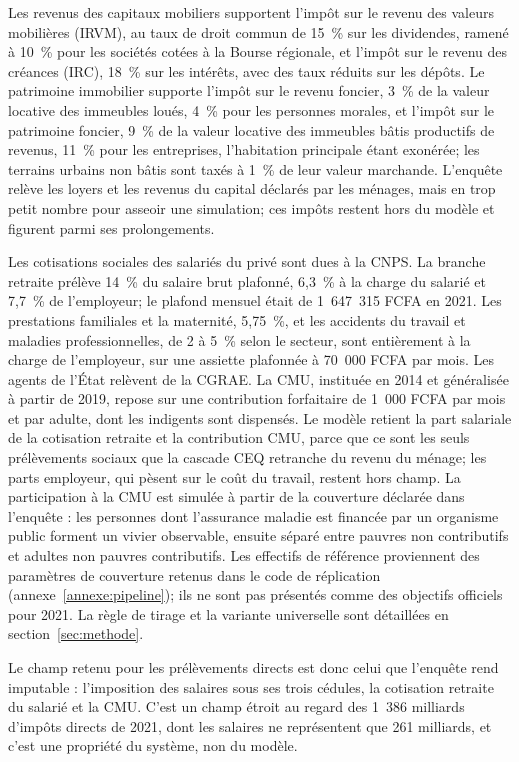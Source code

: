 \documentclass[11pt,a4paper]{article}
\begin{document}
Les revenus des capitaux mobiliers supportent l'impôt sur le revenu des valeurs
mobilières (IRVM), au taux de droit commun de 15~\% sur les dividendes, ramené à
10~\% pour les sociétés cotées à la Bourse régionale, et l'impôt sur le revenu
des créances (IRC), 18~\% sur les intérêts, avec des taux réduits sur les
dépôts. Le patrimoine immobilier supporte l'impôt sur le revenu foncier, 3~\% de
la valeur locative des immeubles loués, 4~\% pour les personnes morales, et
l'impôt sur le patrimoine foncier, 9~\% de la valeur locative des immeubles
bâtis productifs de revenus, 11~\% pour les entreprises, l'habitation principale
étant exonérée; les terrains urbains non bâtis sont taxés à 1~\% de leur valeur
marchande. L'enquête relève les loyers et les revenus du capital déclarés par
les ménages, mais en trop petit nombre pour asseoir une simulation; ces impôts
restent hors du modèle et figurent parmi ses prolongements.

Les cotisations sociales des salariés du privé sont dues à la CNPS. La branche
retraite prélève 14~\% du salaire brut plafonné, 6,3~\% à la charge du salarié
et 7,7~\% de l'employeur; le plafond mensuel était de 1~647~315 FCFA en 2021.
Les prestations familiales et la maternité, 5,75~\%, et les accidents du travail
et maladies professionnelles, de 2 à 5~\% selon le secteur, sont entièrement à
la charge de l'employeur, sur une assiette plafonnée à 70~000 FCFA par mois. Les
agents de l'État relèvent de la CGRAE. La CMU, instituée en 2014 et généralisée
à partir de 2019, repose sur une contribution forfaitaire de 1~000 FCFA par mois
et par adulte, dont les indigents sont dispensés. Le modèle retient la part
salariale de la cotisation retraite et la contribution CMU, parce que ce sont
les seuls prélèvements sociaux que la cascade CEQ retranche du revenu du ménage;
les parts employeur, qui pèsent sur le coût du travail, restent hors champ. La
participation à la CMU est simulée à partir de la couverture déclarée dans
l'enquête : les personnes dont l'assurance maladie est financée par un organisme
public forment un vivier observable, ensuite séparé entre pauvres non
contributifs et adultes non pauvres contributifs. Les effectifs de référence
proviennent des paramètres de couverture retenus dans le code de réplication
(annexe~\ref{annexe:pipeline}); ils ne sont pas présentés comme des objectifs
officiels pour 2021. La règle de tirage et la variante universelle sont
détaillées en section~\ref{sec:methode}.

Le champ retenu pour les prélèvements directs est donc celui que l'enquête rend
imputable : l'imposition des salaires sous ses trois cédules, la cotisation
retraite du salarié et la CMU. C'est un champ étroit au regard des 1~386
milliards d'impôts directs de 2021, dont les salaires ne représentent que 261
milliards, et c'est une propriété du système, non du modèle.
\end{document}
